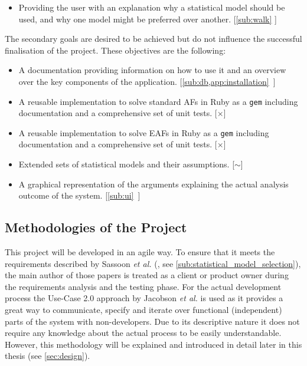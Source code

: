 \begin{itemize}
\begin{itemize}
		\item A comprehensive set of unit and integration tests. \hfill\mbox{[\cref{app:rspec} \checkmark]}
		\item Hosting at a public accessible provider. \hfill\mbox{[\cref{sub:technical} \checkmark]}
	\end{itemize}	
	\item Providing the user with an explanation why a statistical model should be used, and why one model might be preferred over another. \hfill[\cref{sub:walk} \checkmark]
\end{itemize}

\bigskip

The secondary goals are desired to be achieved but do not influence the successful finalisation of the project. These objectives are the following:

\begin{itemize}
	\item A documentation providing information on how to use it and an overview over the key components of the application. \hfill\mbox{[\cref{sub:db,app:installation} \checkmark]}
	\item A reusable implementation to solve standard \glspl{AF} in Ruby as a \texttt{gem} including documentation and a comprehensive set of unit tests. \hfill\mbox{[$\times$]}
	\item A reusable implementation to solve \glspl{EAF} in Ruby as a \texttt{gem} including documentation and a comprehensive set of unit tests. \hfill\mbox{[$\times$]}
	\item Extended sets of statistical models and their assumptions. \hfill\mbox{[$\sim$]}
	\item A graphical representation of the arguments explaining the actual analysis outcome of the system. \hfill\mbox{[\autoref{sub:ui} \checkmark]}
\end{itemize}


\subsection{Methodologies of the Project}
\label{sub:methodologies}
This project will be developed in an agile way. To ensure that it meets the requirements described by Sassoon \textit{et al.} (\cite{sassoon2016,sassoon2014, sassoon2016CD}, see \autoref{sub:statistical_model_selection}), the main author of those papers is treated as a client or \gls{product owner} during the requirements analysis and the testing phase. For the actual development process the Use-Case 2.0 approach by Jacobson \textit{et al.} \cite{jacobson2011usecase} is used as it provides a great way to communicate, specify and iterate over functional (independent) parts of the system with non-developers. Due to its descriptive nature it does not require any knowledge about the actual process to be easily understandable. However, this methodology will be explained and introduced in detail later in this thesis (see \autoref{sec:design}). 

